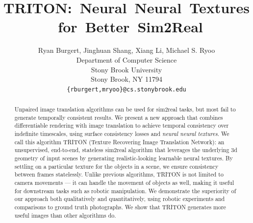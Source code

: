 \documentclass{article}
\title{\mbox{TRITON: Neural Neural Textures for Better Sim2Real}
}
\author{%
	Ryan Burgert, Jinghuan Shang, Xiang Li, Michael S. Ryoo\\
	Department of Computer Science\\
	Stony Brook University\\
	Stony Brook, NY 11794 \\
	\texttt{\{rburgert,mryoo\}@cs.stonybrook.edu} \\
}
\begin{document}
\maketitle


\begin{abstract}
	Unpaired image translation algorithms can be used for sim2real tasks, but most fail to generate temporally consistent results.
	We present a new approach that combines differentiable rendering with image translation to achieve temporal consistency over indefinite timescales, using surface consistency losses and \emph{neural neural textures}.
	We call this algorithm TRITON (Texture Recovering Image Translation Network): an unsupervised, end-to-end, stateless sim2real algorithm that 
	leverages the underlying 3d geometry of input scenes by generating realistic-looking learnable neural textures.
	By settling on a particular texture for the objects in a scene, we ensure consistency between frames statelessly.
	Unlike previous algorithms, TRITON is not limited to camera movements --- it can handle the movement of objects as well, making it useful for downstream tasks such as robotic manipulation.
		We demonstrate the superiority of our approach both qualitatively and quantitatively, using robotic experiments and comparisons to ground truth photographs. We show that TRITON generates more useful images than other algorithms do.
\end{abstract}
\end{document}
